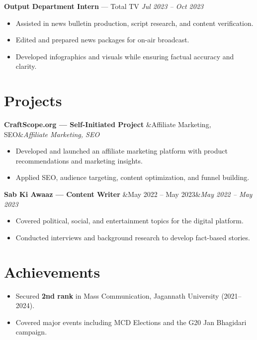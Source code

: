 \documentclass[10pt,a4paper]{article}
\newcommand{\role}[3]{%
  \vspace{5pt}%
  \textbf{#1} \textnormal{\textcolor{midgrey}{--- #2}}%
  \hfill\textcolor{midgrey}{\textit{#3}}%
  \vspace{1pt}%
}
\newcommand{\project}[2][]{%
  \vspace{5pt}%
  \textbf{#2}%
  \ifx&#1&\else\hfill\textcolor{midgrey}{\textit{#1}}\fi%
  \vspace{1pt}%
}
\begin{document}
\role{Output Department Intern}{Total TV}{Jul 2023 -- Oct 2023}
\begin{itemize}
  \item Assisted in news bulletin production, script research, and content verification.
  \item Edited and prepared news packages for on-air broadcast.
  \item Developed infographics and visuals while ensuring factual accuracy and clarity.
\end{itemize}

\section{Projects}

\project[Affiliate Marketing, SEO]{CraftScope.org --- Self-Initiated Project}
\begin{itemize}
  \item Developed and launched an affiliate marketing platform with product recommendations and marketing insights.
  \item Applied SEO, audience targeting, content optimization, and funnel building.
\end{itemize}

\project[May 2022 -- May 2023]{Sab Ki Awaaz --- Content Writer}
\begin{itemize}
  \item Covered political, social, and entertainment topics for the digital platform.
  \item Conducted interviews and background research to develop fact-based stories.
\end{itemize}

\section{Achievements}
\begin{itemize}
  \item Secured \textbf{2nd rank} in Mass Communication, Jagannath University (2021--2024).
  \item Covered major events including MCD Elections and the G20 Jan Bhagidari campaign.
\end{itemize}
\end{document}
